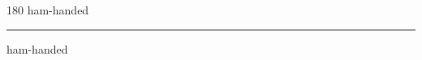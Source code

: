 
\begin{frame}
\begin{center}
\begin{turn}{180}
{\fontsize{2.5cm}{1em}\selectfont ham-handed}
\end{turn}
\vspace{1em}\par  
\hrule
\vspace{1em}\par  
{\fontsize{2.5cm}{1em}\selectfont ham-handed}
\end{center}
\end{frame}
